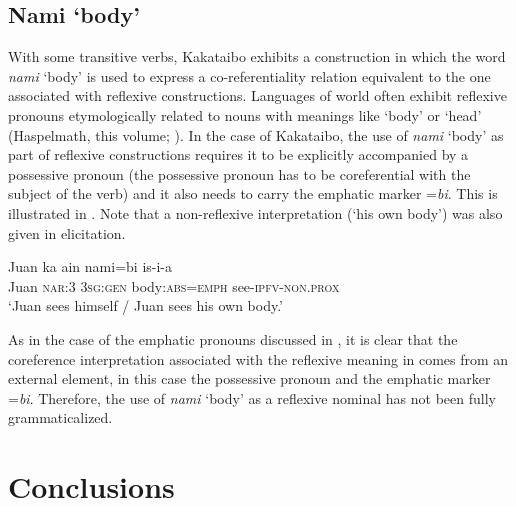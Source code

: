 \documentclass[output=paper,colorlinks,citecolor=brown,modfonts,nonflat]{langscibook}
\begin{document}
\subsection{Nami ‘body’}\label{sec:zariquiey:4.2}

With some transitive verbs, Kakataibo exhibits a construction in which the word \textit{nami} ‘body’ is used to express a co-referentiality relation equivalent to the one associated with reflexive constructions. Languages of world often exhibit reflexive pronouns etymologically related to nouns with meanings like ‘body’ or ‘head’ (Haspelmath, this volume; \citealt{Schladt1999}). In the case of Kakataibo, the use of \textit{nami} ‘body’ as part of reflexive constructions requires it to be explicitly accompanied by a possessive pronoun (the possessive pronoun has to be coreferential with the subject of the verb) and it also needs to carry the emphatic marker =\textit{bi}. This is illustrated in . Note that a non-reflexive interpretation (‘his own body’) was also given in elicitation.

\ea%
    \label{ex:zariquiey:17}
    \gll    Juan  ka  ain  nami=bi  is-i-a\\
            Juan  \textsc{nar:3}  \textsc{3sg:gen}    body\textsc{:abs=emph}  see-\textsc{ipfv-non.prox}\\
    \glt    ‘Juan sees himself / Juan sees his own body.’
\z

As in the case of the emphatic pronouns discussed in , it is clear that the coreference interpretation associated with the reflexive meaning in  comes from an external element, in this case the possessive pronoun and the emphatic marker =\textit{bi}. Therefore, the use of \textit{nami} ‘body’ as a reflexive nominal has not been fully grammaticalized.

\section{Conclusions}\label{sec:zariquiey:5}
\end{document}

